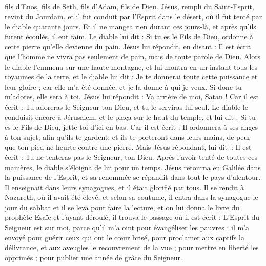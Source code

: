 \begin{multicols}{2}
fils d'Enos, fils de Seth, fils d'Adam, fils de Dieu.
\VerseOne{}Jésus, rempli du Saint-Esprit, revint du Jourdain, et il fut conduit par l'Esprit dans le désert,
où il fut tenté par le diable quarante jours. Et il ne mangea rien durant ces jours-là, et après qu'ils furent écoulés, il eut faim.
Le diable lui dit : Si tu es le Fils de Dieu, ordonne à cette pierre qu'elle devienne du pain.
Jésus lui répondit, en disant : Il est écrit que l'homme ne vivra pas seulement de pain, mais de toute parole de Dieu.
Alors le diable l'emmena sur une haute montagne, et lui montra en un instant tous les royaumes de la terre,
et le diable lui dit : Je te donnerai toute cette puissance et leur gloire ; car elle m'a été donnée, et je la donne à qui je veux.
Si donc tu m'adores, elle sera à toi.
Jésus lui répondit : Va arrière de moi, Satan ! Car il est écrit : Tu adoreras le Seigneur ton Dieu, et tu le serviras lui seul.
Le diable le conduisit encore à Jérusalem, et le plaça sur le haut du temple, et lui dit : Si tu es le Fils de Dieu, jette-toi d'ici en bas.
Car il est écrit : Il ordonnera à ses anges à ton sujet, afin qu'ils te gardent;
et ils te porteront dans leurs mains, de peur que ton pied ne heurte contre une pierre.
Mais Jésus répondant, lui dit : Il est écrit : Tu ne tenteras pas le Seigneur, ton Dieu.
Après l'avoir tenté de toutes ces manières, le diable s'éloigna de lui pour un temps.
Jésus retourna en Galilée dans la puissance de l'Esprit, et sa renommée se répandit dans tout le pays d'alentour.
Il enseignait dans leurs synagogues, et il était glorifié par tous.
Il se rendit à Nazareth, où il avait été élevé, et selon sa coutume, il entra dans la synagogue le jour du sabbat et il se leva pour faire la lecture,
et on lui donna le livre du prophète Esaïe et l'ayant déroulé, il trouva le passage où il est écrit :
L'Esprit du Seigneur est sur moi, parce qu'il m'a oint pour évangéliser les pauvres ; il m'a envoyé pour guérir ceux qui ont le cœur brisé,
pour proclamer aux captifs la délivrance, et aux aveugles le recouvrement de la vue ; pour mettre en liberté les opprimés ; pour publier une année de grâce du Seigneur.

\end{multicols}
